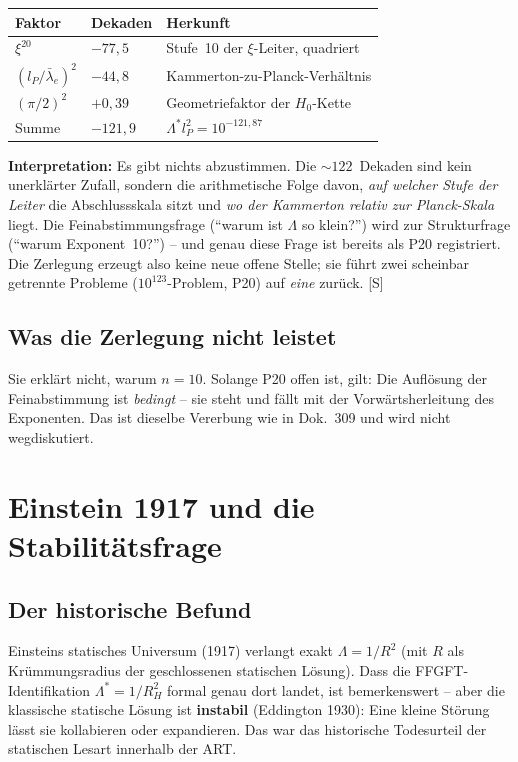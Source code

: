 \documentclass[11pt]{report}
\begin{document}
\begin{center}
\begin{tabular}{lll}
\toprule
Faktor & Dekaden & Herkunft \\
\midrule
$\xi^{20}$ & $-77{,}5$ & Stufe~10 der $\xi$-Leiter, quadriert \\
$(l_P/\bar\lambda_e)^2$ & $-44{,}8$ & Kammerton-zu-Planck-Verhältnis \\
$(\pi/2)^2$ & $+0{,}39$ & Geometriefaktor der $H_0$-Kette \\
\midrule
Summe & $-121{,}9$ & $\Lambda^{*}l_P^2 = 10^{-121{,}87}$ \\
\bottomrule
\end{tabular}
\end{center}

\textbf{Interpretation:} Es gibt nichts abzustimmen. Die
$\sim\!122$~Dekaden sind kein unerklärter Zufall, sondern die
arithmetische Folge davon, \emph{auf welcher Stufe der Leiter} die
Abschlussskala sitzt und \emph{wo der Kammerton relativ zur
Planck-Skala} liegt. Die Feinabstimmungsfrage
(\enquote{warum ist $\Lambda$ so klein?}) wird zur Strukturfrage
(\enquote{warum Exponent~10?}) -- und genau diese Frage ist bereits
als P20 registriert. Die Zerlegung erzeugt also keine neue offene
Stelle; sie führt zwei scheinbar getrennte Probleme
($10^{123}$-Problem, P20) auf \emph{eine} zurück. [S]

\section{Was die Zerlegung nicht leistet}

Sie erklärt nicht, warum $n=10$. Solange P20 offen ist, gilt: Die
Auflösung der Feinabstimmung ist \emph{bedingt} -- sie steht und
fällt mit der Vorwärtsherleitung des Exponenten. Das ist dieselbe
Vererbung wie in Dok.~309 und wird nicht wegdiskutiert.

\chapter{Einstein 1917 und die Stabilitätsfrage}

\section{Der historische Befund}

Einsteins statisches Universum (1917) verlangt exakt
$\Lambda = 1/R^2$ (mit $R$ als Krümmungsradius der geschlossenen
statischen Lösung). Dass die FFGFT-Identifikation
$\Lambda^{*} = 1/R_H^2$ formal genau dort landet, ist bemerkenswert --
aber die klassische statische Lösung ist \textbf{instabil}
(Eddington 1930): Eine kleine Störung lässt sie kollabieren oder
expandieren. Das war das historische Todesurteil der statischen
Lesart innerhalb der ART.
\end{document}
